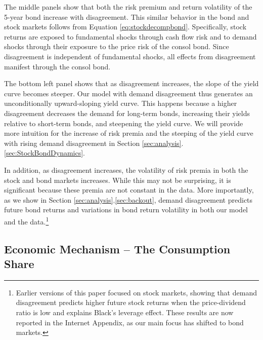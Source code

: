 \documentclass[preprint,11pt,authoryear]{elsarticle}
\theoremstyle{plain}
\begin{document}
 The middle panels show that both the risk premium and return volatility of the 5-year bond increase with disagreement. This similar behavior in the bond and stock markets follows from Equation \eqref{eq:stockdecompbond}. Specifically, stock returns are exposed to fundamental shocks through cash flow risk and to demand shocks through their exposure to the price risk of the consol bond. Since disagreement is independent of fundamental shocks, all effects from disagreement manifest through the consol bond.

The bottom left panel shows that as disagreement increases, the slope of the yield curve becomes steeper. Our model with demand disagreement thus generates an unconditionally upward-sloping yield curve. This happens because a higher disagreement decreases the demand for long-term bonds, increasing their yields relative to short-term bonds, and steepening the yield curve. We will provide more intuition for the increase of risk premia and the steeping of the yield curve with rising demand disagreement in Section \ref{sec:analysis}.\ref{sec:StockBondDynamics}.

In addition, as disagreement increases, the volatility of risk premia in both the stock and bond markets increases. While this may not be surprising, it is significant because these premia are not constant in the data. More importantly, as we show in Section \ref{sec:analysis}.\ref{sec:backout}, demand disagreement predicts future bond returns and variations in bond return volatility in both our model and the data.\footnote{Earlier versions of this paper focused on stock markets, showing that demand disagreement predicts higher future stock returns when the price-dividend ratio is low and explains Black's leverage effect. These results are now reported in the Internet Appendix, as our main focus has shifted to bond markets.}



\subsection{Economic Mechanism -- The Consumption Share}
\end{document}
